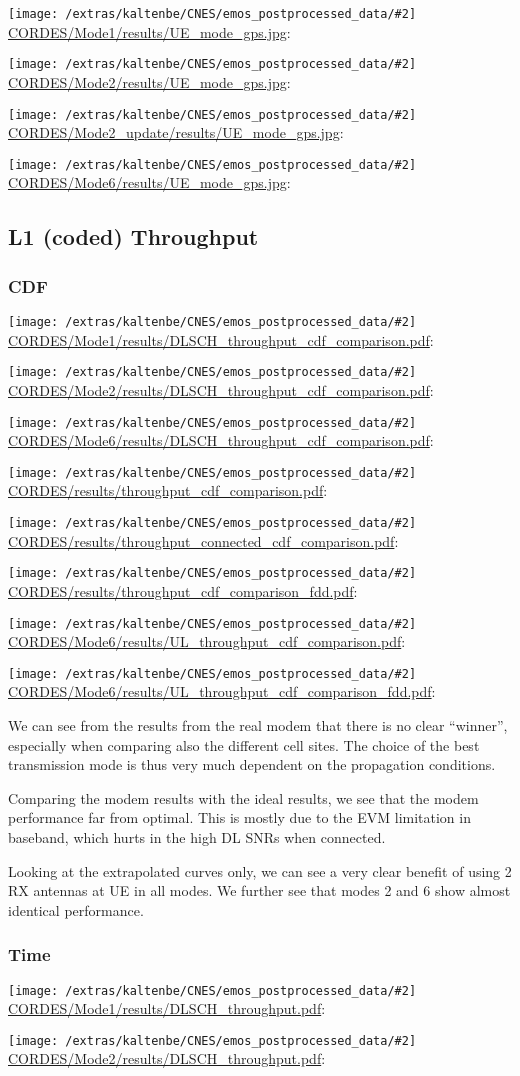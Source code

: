 \documentclass[a4paper,10pt]{article}
\newcommand{\printfile}[2][]{
 \begin{minipage}{8cm}
  \centering
  \texttt{[image: /extras/kaltenbe/CNES/emos\_postprocessed\_data/\#2]}
  \url{#2}: #1

 \end{minipage}
}
\begin{document}
\printfile{CORDES/Mode1/results/UE_mode_gps.jpg}
\printfile{CORDES/Mode2/results/UE_mode_gps.jpg}

\printfile{CORDES/Mode2_update/results/UE_mode_gps.jpg}
\printfile{CORDES/Mode6/results/UE_mode_gps.jpg}

\subsection{L1 (coded) Throughput}


\subsubsection{CDF}

\printfile{CORDES/Mode1/results/DLSCH_throughput_cdf_comparison.pdf}
\printfile{CORDES/Mode2/results/DLSCH_throughput_cdf_comparison.pdf}

\printfile{CORDES/Mode6/results/DLSCH_throughput_cdf_comparison.pdf}

\printfile{CORDES/results/throughput_cdf_comparison.pdf}
\printfile{CORDES/results/throughput_connected_cdf_comparison.pdf}

\printfile{CORDES/results/throughput_cdf_comparison_fdd.pdf}

\printfile{CORDES/Mode6/results/UL_throughput_cdf_comparison.pdf}
\printfile{CORDES/Mode6/results/UL_throughput_cdf_comparison_fdd.pdf}

We can see from the results from the real modem that there is no clear ``winner'', especially when comparing also the different cell sites. The choice of the best transmission mode is thus very much dependent on the propagation conditions. 

Comparing the modem results with the ideal results, we see that the modem performance far from optimal. This is mostly due to the EVM limitation in baseband, which hurts in the high DL SNRs when connected.

Looking at the extrapolated curves only, we can see a very clear benefit of using 2 RX antennas at UE in all modes. We further see that modes 2 and 6 show almost identical performance. 


\subsubsection{Time}

\printfile{CORDES/Mode1/results/DLSCH_throughput.pdf}
\printfile{CORDES/Mode2/results/DLSCH_throughput.pdf}
\end{document}
